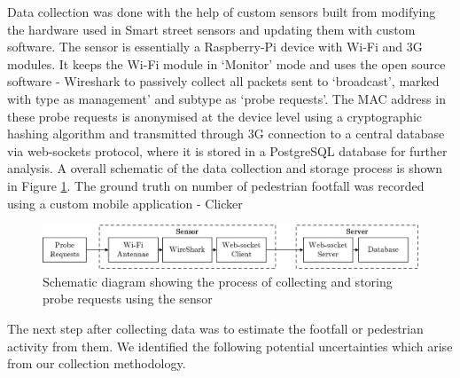 Data collection was done with the help of custom sensors built from modifying
the hardware used in Smart street sensors \citep{sss2016} and updating them with
custom software. The sensor is essentially a Raspberry-Pi device with Wi-Fi and
3G modules. It keeps the Wi-Fi module in `Monitor' mode and uses the open source
software - Wireshark \citep{wireshark2} to passively collect all packets sent to
`broadcast', marked with type as management' and subtype as `probe requests'.
The MAC address in these probe requests is anonymised at the device level using
a cryptographic hashing algorithm and transmitted through 3G connection to a
central database via web-sockets protocol, where it is stored in a PostgreSQL
database for further analysis. A overall schematic of the data collection and
storage process is shown in Figure \ref{datacollection_schematic}. The ground
truth on number of pedestrian footfall was recorded using a custom mobile
application - Clicker \citep{bala2018clicker}

\begin{figure} 
\centering \includegraphics[width=\linewidth]
	{images/datacollection_schematic.jpeg}
\caption 
	{Schematic diagram showing the process of collecting and storing probe
	requests using the sensor}
\label{datacollection_schematic} 
\end{figure}

The next step after collecting data was to estimate the footfall or pedestrian
activity from them. We identified the following potential uncertainties which
arise from our collection methodology. 

